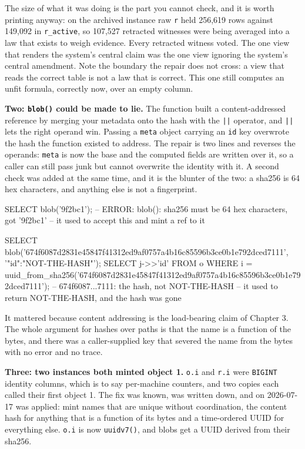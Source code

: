 The size of what it was doing is the part you cannot check, and it is worth printing anyway: on the archived instance raw \texttt{r} held 256,619 rows against 149,092 in \texttt{r\_active}, so 107,527 retracted witnesses were being averaged into a law that exists to weigh evidence. Every retracted witness voted. The one view that renders the system's central claim was the one view ignoring the system's central amendment. Note the boundary the repair does not cross: a view that reads the correct table is not a law that is correct. This one still computes an unfit formula, correctly now, over an empty column.

\textbf{Two: \texttt{blob()} could be made to lie.} The function built a content-addressed reference by merging your metadata onto the hash with the \texttt{||} operator, and \texttt{||} lets the right operand win. Passing a \texttt{meta} object carrying an \texttt{id} key overwrote the hash the function existed to address. The repair is two lines and reverses the operands: \texttt{meta} is now the base and the computed fields are written over it, so a caller can still pass junk but cannot overwrite the identity with it. A second check was added at the same time, and it is the blunter of the two: a sha256 is 64 hex characters, and anything else is not a fingerprint.

\begin{Check}
SELECT blob('9f2bc1');
--   ERROR: blob(): sha256 must be 64 hex characters, got '9f2bc1'
--   it used to accept this and mint a ref to it

SELECT blob('674f6087d2831e45847f41312ed9af0757a4b16c85596b3ce0b1e792dced7111',
            '{"id":"NOT-THE-HASH"}');
SELECT j->>'id' FROM o
 WHERE i = uuid_from_sha256('674f6087d2831e45847f41312ed9af0757a4b16c85596b3ce0b1e792dced7111');
--   674f6087...7111: the hash, not NOT-THE-HASH
--   it used to return NOT-THE-HASH, and the hash was gone
\end{Check}

It mattered because content addressing is the load-bearing claim of Chapter 3. The whole argument for hashes over paths is that the name is a function of the bytes, and there was a caller-supplied key that severed the name from the bytes with no error and no trace.

\textbf{Three: two instances both minted object 1.} \texttt{o.i} and \texttt{r.i} were \texttt{BIGINT} identity columns, which is to say per-machine counters, and two copies each called their first object 1. The fix was known, was written down, and on 2026-07-17 was applied: mint names that are unique without coordination, the content hash for anything that is a function of its bytes and a time-ordered UUID for everything else. \texttt{o.i} is now \texttt{uuidv7()}, and blobs get a UUID derived from their sha256.

